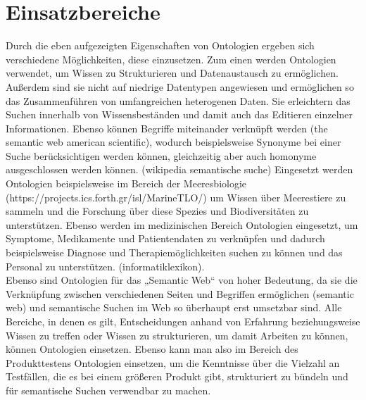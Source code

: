 \section{Einsatzbereiche}
Durch die eben aufgezeigten Eigenschaften von Ontologien ergeben sich verschiedene Möglichkeiten, diese einzusetzen. Zum einen werden Ontologien verwendet, um Wissen zu Strukturieren und Datenaustausch zu ermöglichen. Außerdem sind sie nicht auf niedrige Datentypen angewiesen und ermöglichen so das Zusammenführen von umfangreichen heterogenen Daten. Sie erleichtern das Suchen innerhalb von Wissensbeständen und damit auch das Editieren einzelner Informationen. Ebenso können Begriffe miteinander verknüpft werden (the semantic web american scientific), wodurch beispielsweise Synonyme bei einer Suche berücksichtigen werden können, gleichzeitig aber auch homonyme ausgeschlossen werden können. (wikipedia semantische suche)
Eingesetzt werden Ontologien beispielsweise im Bereich der Meeresbiologie (https://projects.ics.forth.gr/isl/MarineTLO/) um Wissen über Meerestiere zu sammeln und die Forschung über diese Spezies und Biodiversitäten zu unterstützen. Ebenso werden im medizinischen Bereich Ontologien eingesetzt, um Symptome, Medikamente und Patientendaten zu verknüpfen und dadurch beispielsweise Diagnose und Therapiemöglichkeiten suchen zu können und das Personal zu unterstützen. (informatiklexikon).\\

Ebenso sind Ontologien für das „Semantic Web“ von hoher Bedeutung, da sie die Verknüpfung zwischen verschiedenen Seiten und Begriffen ermöglichen (semantic web) und semantische Suchen im Web so überhaupt erst umsetzbar sind. \newline
Alle Bereiche, in denen es gilt, Entscheidungen anhand von Erfahrung beziehungsweise Wissen zu treffen oder Wissen zu strukturieren, um damit Arbeiten zu können, können Ontologien einsetzen.\newline
Ebenso kann man also im Bereich des Produkttestens Ontologien einsetzen, um die Kenntnisse über die Vielzahl an Testfällen, die es bei einem größeren Produkt gibt, strukturiert zu bündeln und für semantische Suchen verwendbar zu machen. 
